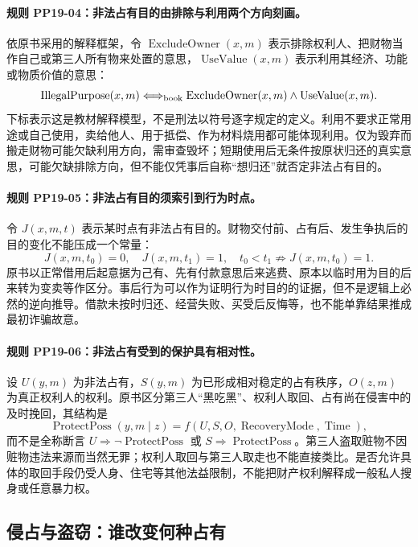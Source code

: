 \paragraph{规则 PP19-04：非法占有目的由排除与利用两个方向刻画。}
\mbox{}\par
依原书采用的解释框架，令 $\operatorname{ExcludeOwner}(x,m)$ 表示排除权利人、把财物当作自己或第三人所有物来处置的意思，$\operatorname{UseValue}(x,m)$ 表示利用其经济、功能或物质价值的意思：
\[
\operatorname{IllegalPurpose}(x,m)
\Longleftrightarrow_{\rm book}
\operatorname{ExcludeOwner}(x,m)\land\operatorname{UseValue}(x,m).
\]
下标表示这是教材解释模型，不是刑法以符号逐字规定的定义。利用不要求正常用途或自己使用，卖给他人、用于抵偿、作为材料烧用都可能体现利用。仅为毁弃而搬走财物可能欠缺利用方向，需审查毁坏；短期使用后无条件按原状归还的真实意思，可能欠缺排除方向，但不能仅凭事后自称“想归还”就否定非法占有目的。

\paragraph{规则 PP19-05：非法占有目的须索引到行为时点。}
\mbox{}\par
令 $J(x,m,t)$ 表示某时点有非法占有目的。财物交付前、占有后、发生争执后的目的变化不能压成一个常量：
\[
J(x,m,t_0)=0,\quad J(x,m,t_1)=1,\quad t_0<t_1
\not\Rightarrow J(x,m,t_0)=1.
\]
原书以正常借用后起意据为己有、先有付款意思后来逃费、原本以临时用为目的后来转为变卖等作区分。事后行为可以作为证明行为时目的的证据，但不是逻辑上必然的逆向推导。借款未按时归还、经营失败、买受后反悔等，也不能单靠结果推成最初诈骗故意。

\paragraph{规则 PP19-06：非法占有受到的保护具有相对性。}
\mbox{}\par
设 $U(y,m)$ 为非法占有，$S(y,m)$ 为已形成相对稳定的占有秩序，$O(z,m)$ 为真正权利人的权利。原书区分第三人“黑吃黑”、权利人取回、占有尚在侵害中的及时挽回，其结构是
\[
\operatorname{ProtectPoss}(y,m\mid z)
=f(U,S,O,\operatorname{RecoveryMode},\operatorname{Time}),
\]
而不是全称断言 $U\Rightarrow\neg\operatorname{ProtectPoss}$ 或 $S\Rightarrow\operatorname{ProtectPoss}$。第三人盗取赃物不因赃物违法来源而当然无罪；权利人取回与第三人取走也不能直接类比。是否允许具体的取回手段仍受人身、住宅等其他法益限制，不能把财产权利解释成一般私人搜身或任意暴力权。

\subsection{侵占与盗窃：谁改变何种占有}
